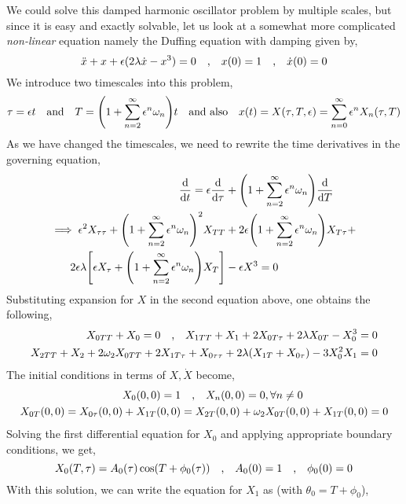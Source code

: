 \documentclass[a4paper,11pt]{article}
\begin{document}
We could solve this damped harmonic oscillator problem by multiple scales, but since it is easy and exactly solvable, let us look at a somewhat more complicated \textit{non-linear} equation namely the Duffing equation with damping given by,
\begin{equation*}
\ddot{x} + x + \epsilon(2 \lambda \dot{x} - x^3) = 0 \qq{,} x(0)=1 \qq{,} \dot{x}(0) = 0 
\end{equation*}
We introduce two timescales into this problem,
\begin{equation*}
\tau = \epsilon t \qq{and} T = \qty(1 + \sum_{n=2}^\infty \epsilon^n \omega_n ) t \qq{and also} x(t) = X(\tau,T, \epsilon) = \sum_{n=0}^{\infty} \epsilon^n X_n(\tau,T)
\end{equation*}
As we have changed the timescales, we need to rewrite the time derivatives in the governing equation,
\begin{align*}
\dv{t} = \epsilon \dv{\tau} &+ \qty(1 + \sum_{n=2}^\infty \epsilon^n \omega_n )\dv{T} \\
\implies \epsilon^2 X_{\tau \tau} + \qty(1 + \sum_{n=2}^\infty \epsilon^n \omega_n )^2 X_{TT} &+ 2 \epsilon \qty(1 + \sum_{n=2}^\infty \epsilon^n \omega_n ) X_{T \tau} + 
\\2 \epsilon \lambda \qty[\epsilon X_\tau + \qty(1 + \sum_{n=2}^\infty \epsilon^n \omega_n ) X_{T}]  &- \epsilon X^3 = 0 
\end{align*}
Substituting expansion for $ X $ in the second equation above, one obtains the following,
\begin{align*}
X_{0TT} + X_0 = 0 \qq{,} X_{1TT}  + X_1 + 2 X_{0T \tau} + 2 \lambda X_{0T} - X_0^3 = 0 \\
X_{2TT} + X_2 + 2 \omega_2 X_{0TT} + 2 X_{1 T \tau} + X_{0 \tau \tau } + 2 \lambda (X_{1T} + X_{0 \tau}) - 3 X_0^2 X_1 = 0
\end{align*}
The initial conditions in terms of $ X, \dot{X}$ become,
\begin{align*}
X_0(0,0) = 1 &\qq{,} X_n(0,0 ) = 0 , \forall n \ne 0 \\
X_{0T}(0,0) = X_{0 \tau}(0,0) + X_{1 T}(0,0) &= X_{2T}(0,0) + \omega_2 X_{0T}(0,0) + X_{1T}(0,0) = 0 
\end{align*}
Solving the first differential equation for $ X_0 $ and applying appropriate boundary conditions, we get,
\begin{equation*}
X_0(T, \tau) = A_0(\tau) \cos(T + \phi_0(\tau))  \qq{,} A_0(0) = 1 \qq{,} \phi_0( 0) = 0 
\end{equation*}
With this solution, we can write the equation for $ X_1 $ as (with $ \theta_0 = T + \phi_0 $),
\end{document}

